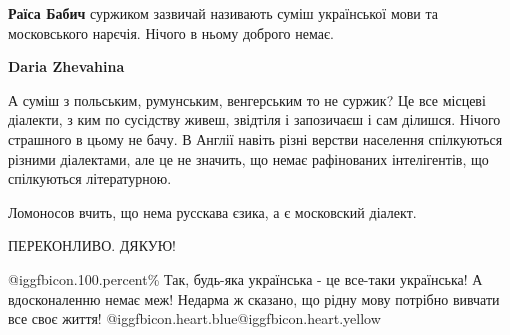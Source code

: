 \begin{itemize}
\begin{itemize}
\textbf{Раїса Бабич} суржиком зазвичай називають суміш української мови та московського нарєчія. Нічого в ньому доброго немає.

 
\textbf{Daria Zhevahina}

А суміш з польським, румунським, венгерським то не суржик? Це все місцеві
діалекти, з ким по сусідству живеш, звідтіля і запозичаєш і сам ділишся. Нічого
страшного в цьому не бачу. В Англії навіть різні верстви населення спілкуються
різними діалектами, але це не значить, що немає рафінованих інтелігентів, що
спілкуються літературною.

\end{itemize}

 
Ломоносов вчить, що нема русскава єзика, а є московский діалект.

 
ПЕРЕКОНЛИВО. ДЯКУЮ!

 
@igg{fbicon.100.percent}\% Так, будь-яка українська - це все-таки українська! А
вдосконаленню немає меж! Недарма ж сказано, що рідну мову потрібно вивчати все
своє життя!  @igg{fbicon.heart.blue}@igg{fbicon.heart.yellow}



 

\end{itemize}
